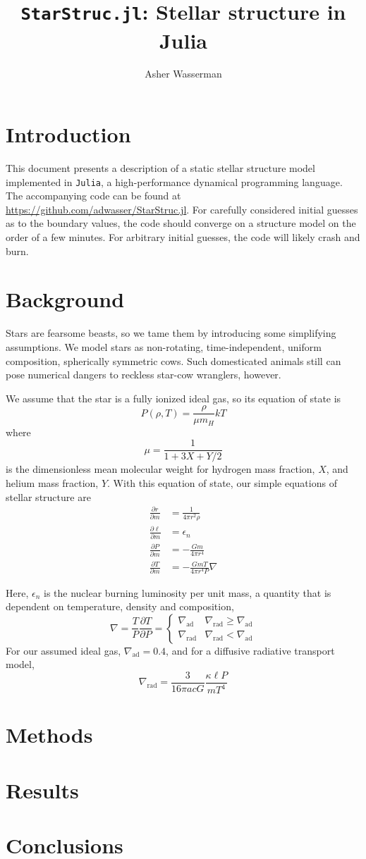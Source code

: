 \documentclass[twocolumn]{article}
\title{\texttt{StarStruc.jl}: Stellar structure in Julia}
\author{Asher Wasserman}
\date{}
\newcommand{\D}[2]{\ensuremath{\frac{\partial #1}{\partial #2}}}
\begin{document}
\maketitle

\section{Introduction}

This document presents a description of a static stellar structure model implemented in \texttt{Julia}, a high-performance dynamical programming language.  The accompanying code can be found at \url{https://github.com/adwasser/StarStruc.jl}.  For carefully considered initial guesses as to the boundary values, the code should converge on a structure model on the order of a few minutes.  For arbitrary initial guesses, the code will likely crash and burn.

\section{Background}

Stars are fearsome beasts, so we tame them by introducing some simplifying assumptions.  We model stars as non-rotating, time-independent, uniform composition, spherically symmetric cows.  Such domesticated animals still can pose numerical dangers to reckless star-cow wranglers, however.

We assume that the star is a fully ionized ideal gas, so its equation of state is
\[ P(\rho, T) = \frac{\rho}{\mu m_H} kT\]
where 
\[ \mu = \frac{1}{1 + 3X + Y/2} \]
is the dimensionless mean molecular weight for hydrogen mass fraction, $X$, and helium mass fraction, $Y$.  With this equation of state, our simple equations of stellar structure are
\begin{align*}
  \D{r}{m} &= \frac{1}{4\pi r^2 \rho} \\
  \D{\ell}{m} &= \epsilon_n \\
  \D{P}{m} &= -\frac{Gm}{4\pi r^4} \\
  \D{T}{m} &= -\frac{GmT}{4\pi r^4P} \nabla
\end{align*}

Here, $\epsilon_n$ is the nuclear burning luminosity per unit mass, a quantity that is dependent on temperature, density and composition, 
\[ \nabla = \frac{T}{P}\D{T}{P} = 
  \begin{cases}
    \nabla_\text{ad} & \nabla_\text{rad} \ge \nabla_\text{ad} \\
    \nabla_\text{rad} & \nabla_\text{rad} < \nabla_\text{ad}
  \end{cases}
\]
For our assumed ideal gas, $\nabla_\text{ad} = 0.4$, and for a diffusive radiative transport model,
\[ \nabla_\text{rad} = \frac{3}{16\pi a c G}\frac{\kappa \ell P}{m T^4}\]

\section{Methods}

\section{Results}

\section{Conclusions}
\end{document}
